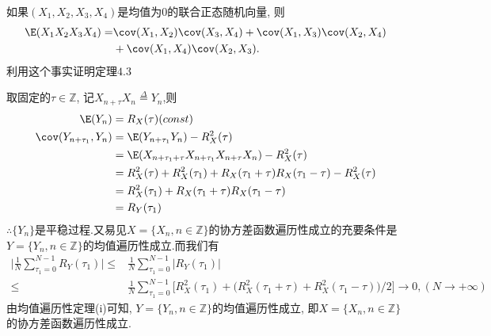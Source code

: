 \begin{problem}{4.15}
如果$(X_1, X_2, X_3, X_4)$是均值为$0$的联合正态随机向量, 则
\[
	\begin{split}
		\E(X_1 X_2 X_3 X_4) = & \cov(X_1,X_2)\cov(X_3,X_4) + \cov(X_1,X_3)\cov(X_2,X_4)\\
		& + \cov(X_1,X_4)\cov(X_2,X_3).
	\end{split}
\]
利用这个事实证明定理$4.3$
\end{problem}
\begin{solution}
	取固定的$\tau\in \mathbb{Z}$, 记$X_{n+\tau}X_n\overset{\Delta}{=}Y_n$,则
	\[
		\begin{split}
			\E(Y_n) & = R_X(\tau)(const)\\
			\cov(Y_{n+\tau_1}, Y_n) & = \E(Y_{n+\tau_1}Y_n) - R^2_X(\tau)\\
			& = \E(X_{n+\tau_1+\tau}X_{n+\tau_1}X_{n+\tau}X_n) - R^2_X(\tau)\\
			& = R^2_X(\tau) + R^2_X(\tau_1) + R_X(\tau_1+\tau)R_X(\tau_1-\tau) - R^2_X(\tau)\\
			& = R^2_X(\tau_1)+R_X(\tau_1+\tau)R_X(\tau_1-\tau)\\
			& = R_Y(\tau_1)
		\end{split}
	\]
	$\therefore \{Y_n\}$是平稳过程.又易见$X = \{X_n, n \in \mathbb{Z}\}$的协方差函数遍历性成立的充要条件是$Y = \{Y_n, n \in \mathbb{Z}\}$的均值遍历性成立.而我们有
	\[
		\begin{split}
			\Bigg|\frac{1}{N}\sum^{N-1}_{\tau_1=0}R_Y(\tau_1)\Bigg| \leqslant & \frac{1}{N}\sum^{N-1}_{\tau_1=0}\Big|R_Y(\tau_1)\Big|\\
			\leqslant & \frac{1}{N}\sum^{N-1}_{\tau_1=0}\bigg[R^2_X(\tau_1) + \Big(R^2_X(\tau_1+\tau)+R^2_X(\tau_1-\tau)\Big)/2\bigg]\rightarrow 0, (N\rightarrow +\infty)
		\end{split}
	\]
	由均值遍历性定理(i)可知, $Y = \{Y_n, n \in \mathbb{Z}\}$的均值遍历性成立, 即$X = \{X_n, n \in \mathbb{Z}\}$的协方差函数遍历性成立.
\end{solution}

